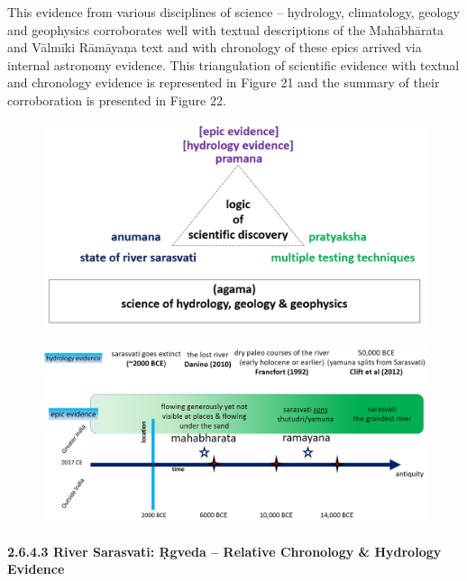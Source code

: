 This evidence from various disciplines of science – hydrology, climatology, geology and geophysics corroborates well with textual descriptions of the Mahābhārata and Vālmīki Rāmāyaņa text and with chronology of these epics arrived via internal astronomy evidence. This triangulation of scientific evidence with textual and chronology evidence is represented in Figure 21 and the summary of their corroboration is presented in Figure 22.

\newpage

\begin{figure}[!htbp]
\includegraphics[scale=0.2]{images/8-21.jpg}
\caption{}\label{art8-fig21}
\end{figure}


\begin{figure}[!htbp]
\includegraphics[scale=0.2]{images/8-22.jpg}
\caption{}\label{art8-fig22}
\end{figure}


\paragraph*{2.6.4.3 River Sarasvati: Ṛgveda – Relative Chronology \& Hydrology Evidence}

